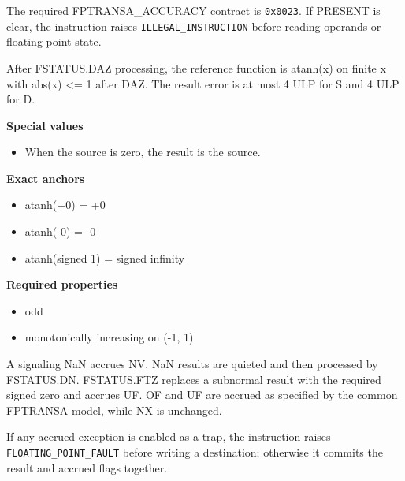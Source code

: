 The required FPTRANSA\_ACCURACY contract is \texttt{0x0023}. If PRESENT is clear, the instruction raises \texttt{ILLEGAL\_INSTRUCTION} before reading operands or floating-point state.

After FSTATUS.DAZ processing, the reference function is atanh(x) on finite x with abs(x) \textless{}= 1 after DAZ. The result error is at most 4 ULP for S and 4 ULP for D.

\textbf{Special values}\par
\begin{itemize}
\item When the source is zero, the result is the source.
\end{itemize}

\textbf{Exact anchors}\par
\begin{itemize}
\item atanh(+0) = +0
\item atanh(-0) = -0
\item atanh(signed 1) = signed infinity
\end{itemize}

\textbf{Required properties}\par
\begin{itemize}
\item odd
\item monotonically increasing on (-1, 1)
\end{itemize}

A signaling NaN accrues NV. NaN results are quieted and then processed by FSTATUS.DN. FSTATUS.FTZ replaces a subnormal result with the required signed zero and accrues UF. OF and UF are accrued as specified by the common FPTRANSA model, while NX is unchanged.

If any accrued exception is enabled as a trap, the instruction raises \texttt{FLOATING\_POINT\_FAULT} before writing a destination; otherwise it commits the result and accrued flags together.
